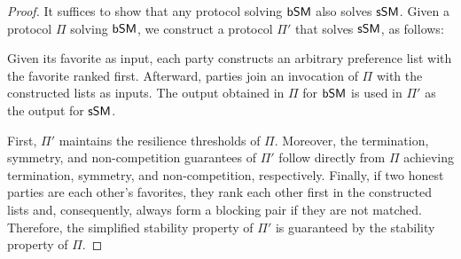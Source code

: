 \begin{proof}
It suffices to show that any protocol solving $\textsf{bSM}$ also solves $\textsf{sSM}$. 
Given a protocol $\Pi$ solving $\textsf{bSM}$, we construct a protocol $\Pi'$ that solves $\textsf{sSM}$, as follows:

Given its favorite as input, each party constructs an arbitrary preference list with the favorite ranked first. Afterward, parties join an invocation of $\Pi$ with the constructed lists as inputs. The output obtained in $\Pi$ for $\textsf{bSM}$ is used in $\Pi'$ as the output for $\textsf{sSM}$.


First, $\Pi'$ maintains the resilience thresholds of $\Pi$. Moreover, the termination, symmetry, and non-competition guarantees of $\Pi'$ follow directly from $\Pi$ achieving termination, symmetry, and non-competition, respectively. Finally, if two honest parties are each other's favorites, they rank each other first in the constructed lists and, consequently, always form a blocking pair if they are not matched. Therefore, the simplified stability property of $\Pi'$ is guaranteed by the stability property of $\Pi$.
\end{proof}

